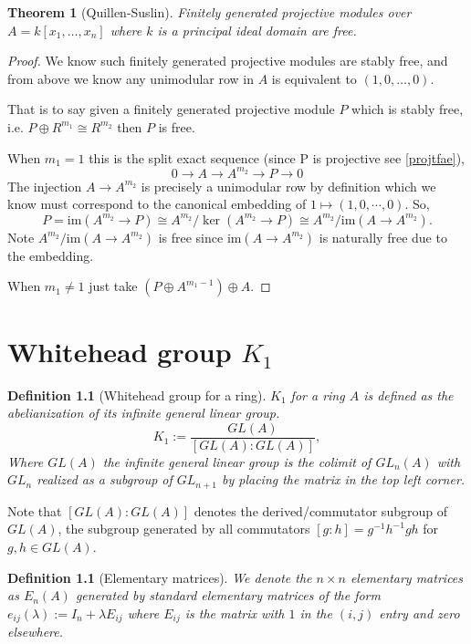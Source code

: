 \documentclass[12pt]{report}
\numberwithin{equation}{section}
\newcounter{dummy} \numberwithin{dummy}{section}
\newtheorem{theorem}[dummy]{Theorem}
\newtheorem{definition}[dummy]{Definition}
\begin{document}
	
	
	\begin{theorem}[Quillen-Suslin]
		Finitely generated projective modules over $A=k[x_1,\dots,x_n]$ where $k$ is a principal ideal domain are free.
	\end{theorem}
	\begin{proof}
		We know such finitely generated projective modules are stably free, and from above we know any unimodular row in $A$ is equivalent to $(1,0,\dots,0)$.
		
		That is to say given a finitely generated projective module $P$ which is stably free, i.e. $P \oplus R^{m_1} \cong R^{m_2}$ then $P$ is free.
		
		When $m_1=1$ this is the split exact sequence (since P is projective see \ref{projtfae}),
		\[ 0 \to A \to A^{m_2}  \to P \to 0 \]
		The injection $A \to A^{m_2}$ is precisely a unimodular row by definition which we know must correspond to the canonical embedding of $1 \mapsto (1,0,\cdots, 0)$.
		So,$$P = \mathrm{im}(A^{m_2} \to P) \cong A^{m_2}/\ker (A^{m_2} \to P) \cong A^{m_2}/\mathrm{im}(A \to A^{m_2}).$$
		Note $A^{m_2}/\mathrm{im}(A \to A^{m_2})$ is free since $\mathrm{im}(A \to A^{m_2})$ is naturally free due to the embedding.
		
		When $m_1 \neq 1$ just take $(P \oplus A^{m_1-1}) \oplus A$.
	\end{proof}


	
	\chapter{Whitehead group $K_1$}
	\begin{definition}[Whitehead group for a ring] $K_1$ for a ring $A$ is defined as the abelianization of its infinite general linear group.
		$$K_1:= \frac{GL(A)}{[GL(A):GL(A)]},$$
		Where $GL(A)$ the infinite general linear group is the colimit of $GL_n(A)$ with $GL_{n}$ realized as a subgroup of $GL_{n+1}$ by placing the matrix in the top left corner. 
	\end{definition}
	Note that $[GL(A):GL(A)]$ denotes the derived/commutator subgroup of $GL(A)$, the subgroup generated by all commutators $[g:h]=g^{-1}h^{-1}gh$ for $g,h \in GL(A)$.
	\begin{definition}[Elementary matrices]
		We denote the $n\times n$ elementary matrices as $E_n(A)$ generated by standard elementary matrices of the form $e_{ij}(\lambda) := I_{n}+ \lambda E_{ij} $ where $E_{ij}$ is the matrix with $1$ in the $(i,j)$ entry and zero elsewhere.
	\end{definition}
	
\end{document}

